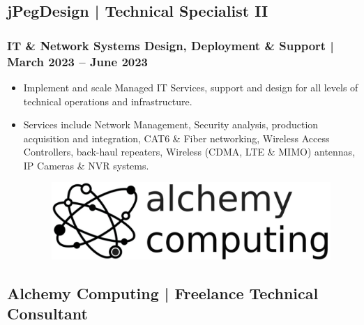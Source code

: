 \documentclass[letter,10pt]{article}
\begin{document}
\subsection*{jPegDesign | Technical Specialist II}
\label{sec:orgf6ff277}
\subsubsection*{IT \& Network Systems Design, Deployment \& Support | March 2023 – June 2023}
\label{sec:orgce01a4f}
\begin{itemize}
\item Implement and scale Managed IT Services, support and design for all levels of technical operations and infrastructure.
\label{sec:org6e45c81}
\item Services include Network Management, Security analysis, production acquisition and integration, CAT6 \& Fiber networking, Wireless Access Controllers, back-haul repeaters, Wireless (CDMA, LTE \& MIMO) antennas, IP Cameras \& NVR systems.
\label{sec:org3a07f30}





\begin{figure}
\includegraphics[width=0.8\linewidth]{./img/50p_alchemy_computing.jpg}
\end{figure}
\end{itemize}

\subsection*{Alchemy Computing | Freelance Technical Consultant}
\label{sec:org4c318b7}
\end{document}
